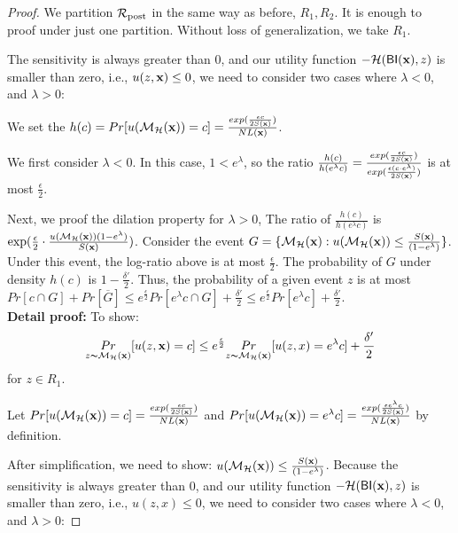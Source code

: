\documentclass{article}
\begin{document}
\begin{proof}
We partition $\mathcal{R}_{\textup{post}}$ in the same way as before, $R_1, R_2$. It is enough to proof under just one partition. Without loss of generalization, we take $R_1$.

The sensitivity is always greater than 0, and our utility function $-\mathcal{H}(\mathsf{BI}(\textbf{x}),z)$ is smaller than zero, i.e., $u(z,\textbf{x}) \leq 0$, we need to consider two cases where $\lambda < 0$, and $\lambda > 0$:

We set the $h(c) = Pr[u(\mathcal{M}_{\mathcal{H}}(\textbf{x})) = c] = \frac{exp(\frac{\epsilon c}{2 S(\textbf{x})})}{NL(\textbf{x})}$.

We first consider $\lambda < 0$. In this case, $1 < e ^ {\lambda}$, so the ratio $\frac{h(c)}{h(e^{\lambda}c)} = \frac{exp(\frac{\epsilon c}{2 S(\textbf{x})})}{exp(\frac{\epsilon (c \cdot e^{\lambda})}{2 S(\textbf{x})})}$ is at most $\frac{\epsilon}{2}$.

Next, we proof the dilation property for $\lambda > 0$, The ratio of $\frac{h(c)}{h(e^{\lambda}c)}$ is $\exp(\frac{\epsilon}{2} \cdot \frac{u(\mathcal{M}_{\mathcal{H}}(\textbf{x})) (1 - e^{\lambda})}{S(\textbf{x})})$. Consider the event $G = \{ \mathcal{M}_{\mathcal{H}}(\textbf{x}) : u(\mathcal{M}_{\mathcal{H}}(\textbf{x})) \leq \frac{S(\textbf{x})}{(1 - e^{\lambda})}\}$. Under this event, the log-ratio above is at most $\frac{\epsilon}{2}$. The probability of $G$ under density $h(c)$ is $1 - \frac{\delta'}{2}$. Thus, the probability of a given event $z$ is at most $Pr[c \cap G] + Pr[\overline{G}] \leq e^{\frac{\epsilon}{2}} Pr[e^{\lambda}c \cap G] + \frac{\delta'}{2} \leq e^{\frac{\epsilon}{2}} Pr[e^{\lambda}c] + \frac{\delta'}{2}$.\\


\textbf{Detail proof:}
	To show:
	\begin{equation*}
	\underset{z \thicksim \mathcal{M}_{\mathcal{H}}(\textbf{x})}{Pr}[u(z,\textbf{x}) = c]
	\leq
	e^{\frac{\epsilon}{2}} \underset{z \thicksim \mathcal{M}_{\mathcal{H}}(\textbf{x})}{Pr}[u(z,x) = e^{\lambda} c] + \frac{\delta'}{2}
	\end{equation*}
	for $z \in R_1$.

	Let $Pr[u(\mathcal{M}_{\mathcal{H}}(\textbf{x})) = c] = \frac{exp(\frac{\epsilon c}{2 S(\textbf{x})})}{NL(\textbf{x})}$ and $Pr[u(\mathcal{M}_{\mathcal{H}}(\textbf{x})) = e^{\lambda} c] = \frac{exp(\frac{\epsilon e^{\lambda} c}{2 S(\textbf{x})})}{NL(\textbf{x})}$ by definition.

	After simplification, we need to show: $u(\mathcal{M}_{\mathcal{H}}(\textbf{x})) \leq \frac{S(\textbf{x})}{(1 - e ^ {\lambda})}$.
	Because the sensitivity is always greater than 0, and our utility function $-\mathcal{H}(\mathsf{BI}(\textbf{x}),z)$ is smaller than zero, i.e., $u(z,x) \leq 0$, we need to consider two cases where $\lambda < 0$, and $\lambda > 0$:


\end{proof}
\end{document}
